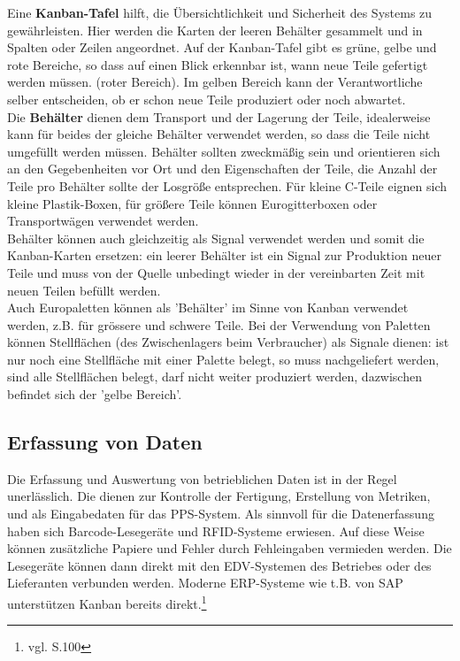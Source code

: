 Eine \textbf{Kanban-Tafel} hilft, die Übersichtlichkeit und Sicherheit des Systems zu gewährleisten. 
Hier werden die Karten der leeren Behälter gesammelt und in Spalten oder Zeilen angeordnet.  
Auf der Kanban-Tafel gibt es grüne, gelbe und rote Bereiche, so dass auf einen Blick erkennbar ist, wann neue Teile gefertigt werden müssen. (roter Bereich).
Im gelben Bereich kann der Verantwortliche selber entscheiden, ob er schon neue Teile produziert oder noch abwartet.\\

Die \textbf{Behälter} dienen dem Transport und der Lagerung der Teile, idealerweise kann für beides der gleiche 
Behälter verwendet werden, so dass die Teile nicht umgefüllt werden müssen. Behälter sollten 
zweckmäßig sein und orientieren sich an den Gegebenheiten vor Ort und den Eigenschaften der Teile, 
die Anzahl der Teile pro Behälter sollte der Losgröße entsprechen.
Für kleine C-Teile eignen sich kleine Plastik-Boxen, für größere Teile können Eurogitterboxen 
oder Transportwägen verwendet werden.\\
Behälter können auch gleichzeitig als Signal verwendet werden und somit die Kanban-Karten ersetzen: ein leerer 
Behälter ist ein Signal zur Produktion neuer Teile und muss von der Quelle unbedingt 
wieder in der vereinbarten Zeit mit neuen Teilen befüllt werden.\\
Auch Europaletten können als 'Behälter' im Sinne von Kanban verwendet werden, z.B. für grössere und schwere Teile.
Bei der Verwendung von Paletten können Stellflächen (des Zwischenlagers beim Verbraucher) als Signale dienen: 
ist nur noch eine Stellfläche mit einer Palette belegt, so muss nachgeliefert werden, sind alle Stellflächen belegt, 
darf nicht weiter produziert werden, dazwischen befindet sich der 'gelbe Bereich'.

\subsection{Erfassung von Daten}
Die Erfassung und Auswertung von betrieblichen Daten ist in der Regel unerlässlich.
Die dienen zur Kontrolle der Fertigung, Erstellung von Metriken, und als Eingabedaten für das PPS-System.
Als sinnvoll für die Datenerfassung haben sich Barcode-Lesegeräte und RFID-Systeme erwiesen. 
Auf diese Weise können zusätzliche Papiere und Fehler durch Fehleingaben vermieden werden.
Die Lesegeräte können dann direkt mit den EDV-Systemen des Betriebes oder des Lieferanten verbunden werden.
Moderne ERP-Systeme wie t.B. von SAP unterstützen Kanban bereits direkt.\footnote{vgl. \cite{Weber2014KE} S.100}

